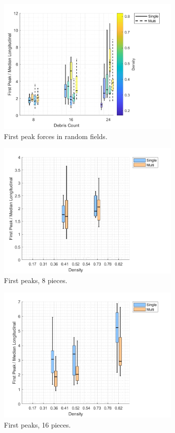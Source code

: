 \documentclass{article}
\begin{document}
\begin{figure}[htbp]
    \centering
    \includegraphics[width=0.8\textwidth]{First_Peak_Random_Single_vs_Multi_ByDensityGradient.png}
    \caption{First peak forces in random fields.}
    \label{fig:random_peaks_first}
\end{figure}

\begin{figure}[htbp]
    \centering
    \includegraphics[width=0.8\textwidth]{Boxplot_Density_vs_PeakValues_8Debris.png}
    \caption{First peaks, 8 pieces.}
    \label{fig:boxplot_8}
\end{figure}

\begin{figure}[htbp]
    \centering
    \includegraphics[width=0.8\textwidth]{Boxplot_Density_vs_PeakValues_16Debris.png}
    \caption{First peaks, 16 pieces.}
    \label{fig:boxplot_16}
\end{figure}
\end{document}
